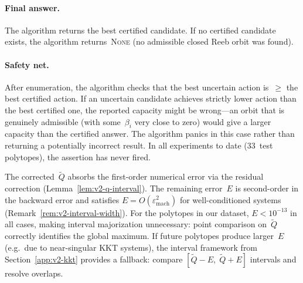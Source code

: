 \paragraph{Final answer.}
The algorithm returns the best certified candidate.
If no certified candidate exists, the algorithm
returns~\textsc{None} (no admissible closed Reeb
orbit was found).

\paragraph{Safety net.}
After enumeration, the algorithm checks that the best
uncertain action is~$\geq$ the best certified action.
If an uncertain candidate achieves strictly lower action
than the best certified one, the reported capacity might
be wrong---an orbit that is genuinely admissible
(with some~$\beta_i$ very close to zero) would give
a larger capacity than the certified answer.
The algorithm panics in this case rather than returning
a potentially incorrect result.
In all experiments to date (33~test polytopes),
the assertion has never fired.

\begin{remark}%
\label{rem:v2-point-comparison}
The corrected~$\tilde Q$ absorbs the first-order
numerical error via the residual correction
(Lemma~\ref{lem:v2-q-interval}).
The remaining error~$E$ is second-order
in the backward error and satisfies
$E = O(\varepsilon_{\mathrm{mach}}^2)$ for
well-conditioned systems
(Remark~\ref{rem:v2-interval-width}).
For the polytopes in our dataset,
$E < 10^{-13}$ in all cases, making interval
majorization unnecessary: point comparison
on~$\tilde Q$ correctly identifies the global
maximum.
If future polytopes produce larger~$E$ (e.g.\ due
to near-singular KKT systems),
the interval framework from
Section~\ref{app:v2-kkt} provides a fallback:
compare $[\tilde Q - E,\; \tilde Q + E]$ intervals
and resolve overlaps.
\end{remark}

